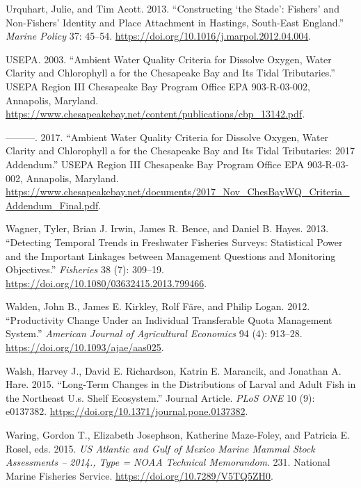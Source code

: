 \documentclass[
]{book}
\begin{document}
\leavevmode\hypertarget{ref-urquhart_constructing_2013}{}%
Urquhart, Julie, and Tim Acott. 2013. ``Constructing `the Stade': Fishers' and Non-Fishers' Identity and Place Attachment in Hastings, South-East England.'' \emph{Marine Policy} 37: 45--54. \url{https://doi.org/10.1016/j.marpol.2012.04.004}.

\leavevmode\hypertarget{ref-usepa2003}{}%
USEPA. 2003. ``Ambient Water Quality Criteria for Dissolve Oxygen, Water Clarity and Chlorophyll a for the Chesapeake Bay and Its Tidal Tributaries.'' USEPA Region III Chesapeake Bay Program Office EPA 903-R-03-002, Annapolis, Maryland. \url{https://www.chesapeakebay.net/content/publications/cbp_13142.pdf}.

\leavevmode\hypertarget{ref-usepa2017}{}%
---------. 2017. ``Ambient Water Quality Criteria for Dissolve Oxygen, Water Clarity and Chlorophyll a for the Chesapeake Bay and Its Tidal Tributaries: 2017 Addendum.'' USEPA Region III Chesapeake Bay Program Office EPA 903-R-03-002, Annapolis, Maryland. \url{https://www.chesapeakebay.net/documents/2017_Nov_ChesBayWQ_Criteria_Addendum_Final.pdf}.

\leavevmode\hypertarget{ref-Wagner2013}{}%
Wagner, Tyler, Brian J. Irwin, James R. Bence, and Daniel B. Hayes. 2013. ``Detecting Temporal Trends in Freshwater Fisheries Surveys: Statistical Power and the Important Linkages between Management Questions and Monitoring Objectives.'' \emph{Fisheries} 38 (7): 309--19. \url{https://doi.org/10.1080/03632415.2013.799466}.

\leavevmode\hypertarget{ref-walden_productivity_2012}{}%
Walden, John B., James E. Kirkley, Rolf Färe, and Philip Logan. 2012. ``Productivity Change Under an Individual Transferable Quota Management System.'' \emph{American Journal of Agricultural Economics} 94 (4): 913--28. \url{https://doi.org/10.1093/ajae/aas025}.

\leavevmode\hypertarget{ref-RN126}{}%
Walsh, Harvey J., David E. Richardson, Katrin E. Marancik, and Jonathan A. Hare. 2015. ``Long-Term Changes in the Distributions of Larval and Adult Fish in the Northeast U.s. Shelf Ecosystem.'' Journal Article. \emph{PLoS ONE} 10 (9): e0137382. \url{https://doi.org/10.1371/journal.pone.0137382}.

\leavevmode\hypertarget{ref-waring_us_2015}{}%
Waring, Gordon T., Elizabeth Josephson, Katherine Maze-Foley, and Patricia E. Rosel, eds. 2015. \emph{US Atlantic and Gulf of Mexico Marine Mammal Stock Assessments -- 2014., Type = NOAA Technical Memorandom}. 231. National Marine Fisheries Service. \url{https://doi.org/10.7289/V5TQ5ZH0}.
\end{document}
